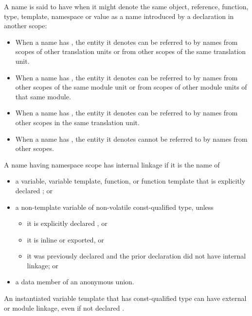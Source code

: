 \pnum
{}%
%
%
%
A name is said to have  when it might denote the same
object, reference, function, type, template, namespace or value as a
name introduced by a declaration in another scope:
\begin{itemize}
\item When a name has ,
the entity it denotes
can be referred to by names from scopes of other translation units or
from other scopes of the same translation unit.

\item When a name has ,
the entity it denotes
can be referred to by names from other scopes of the same module unit or
from scopes of other module units of that same module.

\item When a name has ,
the entity it denotes
can be referred to by names from other scopes in the same translation
unit.

\item When a name has , the entity it denotes
cannot be referred to by names from other scopes.
\end{itemize}

\pnum
{}%
%
%
%
%
%
A name having namespace scope has internal
linkage if it is the name of
\begin{itemize}
\item
  a variable, variable template, function, or function template that is
  explicitly declared ; or
\item
  a non-template variable of non-volatile const-qualified type, unless
  \begin{itemize}
  \item it is explicitly declared , or
  \item it is inline or exported, or
  \item it was previously declared and the prior declaration did
  not have internal linkage; or
  \end{itemize}
\item
  a data member of an anonymous union.
\end{itemize}
\begin{note}
An instantiated variable template that has const-qualified type
can have external or module linkage, even if not declared .
\end{note}

